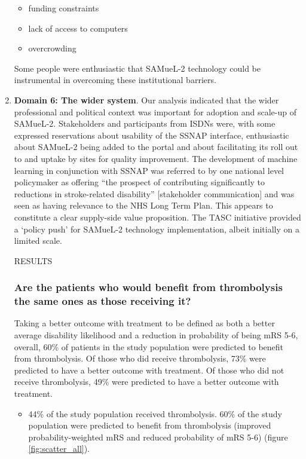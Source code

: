 \begin{enumerate}
\begin{itemize}
    \item funding constraints

    \item lack of access to computers

    \item overcrowding

\end{itemize}

Some people were enthusiastic that SAMueL-2 technology could be instrumental in overcoming these institutional barriers.

    \item \textbf{Domain 6: The wider system}. Our analysis indicated that the wider professional and political context was important for adoption and scale-up of SAMueL-2. Stakeholders and participants from ISDNs were, with some expressed reservations about usability of the SSNAP interface, enthusiastic about SAMueL-2 being added to the portal and about facilitating its roll out to and uptake by sites for quality improvement. The development of machine learning in conjunction with SSNAP was referred to by one national level policymaker as offering “the prospect of contributing significantly to reductions in stroke-related disability” [stakeholder communication] and was seen as having relevance to the NHS Long Term Plan. This appears to constitute a clear supply-side value proposition. The TASC initiative provided a ‘policy push’ for SAMueL-2 technology implementation, albeit initially on a limited scale.

RESULTS

\subsubsection{Are the patients who would benefit from thrombolysis the same ones as those receiving it? \cite{pearn_are_2024}}

Taking a better outcome with treatment to be defined as both a better average disability likelihood and a reduction in probability of being mRS 5-6, overall, 60\% of patients in the study population were predicted to benefit from thrombolysis. Of those who did receive thrombolysis, 73\% were predicted to have a better outcome with treatment. Of those who did not receive thrombolysis, 49\% were predicted to have a better outcome with treatment.

\begin{itemize}
    \item 44\% of the study population received thrombolysis. 60\% of the study population were predicted to benefit from thrombolysis (improved probability-weighted mRS and reduced probability of mRS 5-6) (figure \ref{fig:scatter_all}).
    

\end{itemize}
\end{enumerate}

